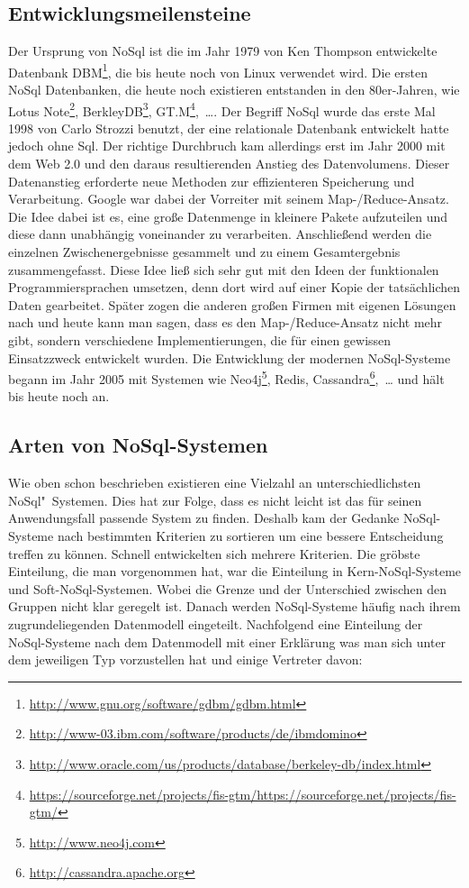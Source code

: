 \subsection{Entwicklungsmeilensteine}
Der Ursprung von NoSql ist die im Jahr 1979 von Ken Thompson entwickelte
Datenbank DBM\footnote{\url{http://www.gnu.org/software/gdbm/gdbm.html}}, die
bis heute noch von Linux verwendet wird. Die ersten NoSql Datenbanken, die
heute noch existieren entstanden in den 80er-Jahren, wie
Lotus Note\footnote{\url{http://www-03.ibm.com/software/products/de/ibmdomino}},
BerkleyDB\footnote{\url{http://www.oracle.com/us/products/database/berkeley-db/index.html}},
GT.M\footnote{\url{https://sourceforge.net/projects/fis-gtm/https://sourceforge.net/projects/fis-gtm/}},~\dots .
Der Begriff NoSql wurde das erste Mal 1998 von Carlo Strozzi benutzt, der eine
relationale Datenbank entwickelt hatte jedoch ohne Sql. Der richtige Durchbruch
kam allerdings erst im Jahr 2000 mit dem Web 2.0 und den daraus resultierenden
Anstieg des Datenvolumens. Dieser Datenanstieg erforderte neue Methoden zur
effizienteren Speicherung und Verarbeitung. Google war dabei der Vorreiter mit
seinem Map-/Reduce-Ansatz. Die Idee dabei ist es, eine große Datenmenge in
kleinere Pakete aufzuteilen und diese dann unabhängig voneinander zu verarbeiten.
Anschließend werden die einzelnen Zwischenergebnisse gesammelt und zu einem
Gesamtergebnis zusammengefasst. Diese Idee ließ sich sehr gut mit den Ideen
der funktionalen Programmiersprachen umsetzen, denn dort wird auf einer Kopie
der tatsächlichen Daten gearbeitet. Später zogen die anderen großen Firmen mit
eigenen Lösungen nach und heute kann man sagen, dass es den Map-/Reduce-Ansatz
nicht mehr gibt, sondern verschiedene Implementierungen, die für einen gewissen
Einsatzzweck entwickelt wurden. Die Entwicklung der modernen NoSql-Systeme
begann im Jahr 2005 mit Systemen wie Neo4j\footnote{\url{http://www.neo4j.com}},
Redis, Cassandra\footnote{\url{http://cassandra.apache.org}},~\dots{} und hält bis
heute noch an.

\subsection{Arten von NoSql-Systemen}
Wie oben schon beschrieben existieren eine Vielzahl an unterschiedlichsten
NoSql"~Systemen. Dies hat zur Folge, dass es nicht leicht ist das für
seinen Anwendungsfall passende System zu finden. Deshalb kam der Gedanke
NoSql-Systeme nach bestimmten Kriterien zu sortieren um eine bessere Entscheidung
treffen zu können. Schnell entwickelten sich mehrere Kriterien. Die gröbste
Einteilung, die man vorgenommen hat, war die Einteilung in Kern-NoSql-Systeme
und Soft-NoSql-Systemen. Wobei die Grenze und der Unterschied zwischen den
Gruppen nicht klar geregelt ist. Danach werden NoSql-Systeme häufig nach ihrem
zugrundeliegenden Datenmodell eingeteilt. Nachfolgend eine Einteilung der
NoSql-Systeme nach dem Datenmodell mit einer Erklärung was man sich unter dem
jeweiligen Typ vorzustellen hat und einige Vertreter davon:


